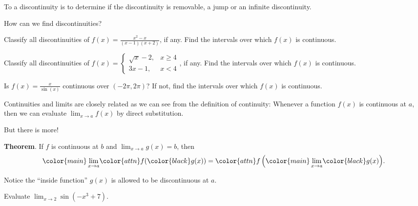 \documentclass[../main.tex]{subfiles}
\begin{document}
To  a discontinuity is to determine if the discontinuity is removable, a jump or an infinite discontinuity.

\faComments{} How can we find discontinuities?


\begin{example}
  Classify all discontinuities of \(f(x) = \frac{x^{2}-x}{(x-1)(x+2)}\), if any.  Find the intervals over which \(f(x)\) is continuous.

\end{example}

\begin{example}
  Classify all discontinuities of \(f(x) = \begin{cases} \sqrt{x} - 2,& x \ge 4 \\ 3x - 1, &x < 4\end{cases}\), if any.  Find the intervals over which \(f(x)\) is continuous.

\end{example}
\clearpage

\begin{example}
  Is \(f(x) = \frac{x}{\sin(x)}\) continuous over \((-2\pi, 2\pi)\)? If not, find the intervals over which \(f(x)\) is continuous.

\end{example}


Continuities and limits are closely related as we can see from the definition of continuity: Whenever a function \(f(x)\) is {continuous} at \(a\), then we can evaluate \(\lim_{x \to a} f(x)\) by direct substitution. 

But there is more!

\begin{mdframed}[style=withref]
  \textbf{Theorem}. If \(f\) is continuous at \(b\) and \(\lim_{x \to a} g(x) = b\), then 
  \[
    {\color{main} \lim_{x \to a}} {\color{attn}f({\color{black}g(x)})} = {\color{attn}f \left( {\color{main} \lim_{x \to a}} {\color{black} g(x) }\right)}.
  \]

\end{mdframed}

Notice the ``inside function'' \(g(x)\) is allowed to be discontinuous at \(a\).

\begin{example}
  Evaluate \(\lim_{x \to 2} \sin( - x^{3} + 7  )\).
\end{example}
\clearpage
\end{document}

